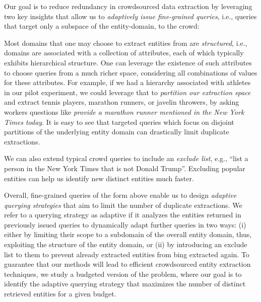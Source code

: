 Our goal is to reduce redundancy in crowdsourced data extraction
by leveraging two key insights
that allow us to {\em adaptively issue fine-grained queries}, 
i.e., queries that target only a subspace of the entity-domain, 
to the crowd:

Most domains that one may choose to extract entities from are {\em structured}, i.e., domains are associated with a collection of attributes, each of which typically exhibits hierarchical structure. One can leverage the existence of such attributes to choose queries from a much richer space, considering all combinations of values for these attributes. For example, if we had a hierarchy associated with athletes in our pilot experiment, we could leverage that to {\em partition our extraction space} and extract tennis players, marathon runners, or javelin throwers, by asking workers questions like {\em provide a marathon runner mentioned in the New York Times today}. It is easy to see that targeted queries which focus on disjoint partitions of the underlying entity domain can drastically limit duplicate extractions.

 We can also extend typical crowd queries to include an {\em exclude list}, e.g., ``list a person in the New York Times that is not Donald Trump''.  Excluding popular entities can help us identify new distinct entities much faster.

 \noindent
Overall, fine-grained queries 
of the form above 
enable us to design {\em adaptive querying strategies} that aim to limit the number of duplicate extractions. We refer to a querying strategy as adaptive if it analyzes the entities returned in previously issued queries to dynamically adapt further queries in two ways: (i) either by limiting their scope to a subdomain of the overall entity domain, thus, exploiting the structure of the entity domain, or (ii) by introducing an exclude list to them to prevent already extracted entities from bing extracted again. To guarantee that our methods will lead to efficient crowdsourced entity extraction techniques, we study a budgeted version of the problem, where our goal is to identify the adaptive querying strategy that maximizes the number of distinct retrieved entities for a given budget.

